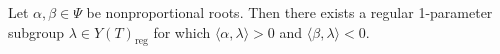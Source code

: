 Let $\alpha, \beta \in \Psi$ be nonproportional roots. Then there exists a regular 1-parameter subgroup $\lambda \in Y(T)_{\text{reg}}$ for which $\langle \alpha, \lambda \rangle > 0$ and $\langle \beta, \lambda \rangle < 0$.
